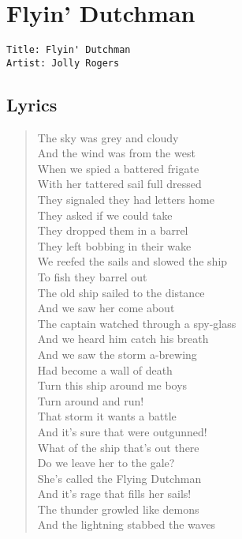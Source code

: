 \documentclass[11pt]{article}
\begin{document}
\section{Flyin' Dutchman}
\label{sec:org06ef4e6}
\begin{verbatim}
Title: Flyin' Dutchman
Artist: Jolly Rogers
\end{verbatim}
\subsection{Lyrics}
\label{sec:org03a7185}
\begin{verse}
The sky was grey and cloudy\\
And the wind was from the west\\
When we spied a battered frigate\\
With her tattered sail full dressed\\
They signaled they had letters home\\
They asked if we could take\\
They dropped them in a barrel\\
They left bobbing in their wake\\
We reefed the sails and slowed the ship\\
To fish they barrel out\\
The old ship sailed to the distance\\
And we saw her come about\\
The captain watched through a spy-glass\\
And we heard him catch his breath\\
And we saw the storm a-brewing\\
Had become a wall of death\\
\vspace*{1em}
Turn this ship around me boys\\
Turn around and run!\\
That storm it wants a battle\\
And it's sure that were outgunned!\\
What of the ship that's out there\\
Do we leave her to the gale?\\
She's called the Flying Dutchman\\
And it's rage that fills her sails!\\
\vspace*{1em}
The thunder growled like demons\\
And the lightning stabbed the waves\\

\end{verse}
\end{document}
